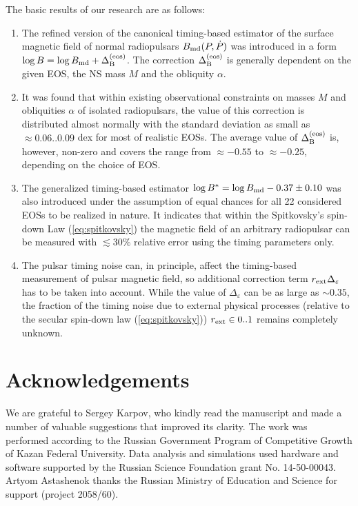 \documentclass[fleqn,usenatbib]{mnras}
\begin{document}
The basic results of our research are as follows:
\begin{enumerate}
\item The refined version of the canonical timing-based estimator of
the surface magnetic field of normal radiopulsars $B_{\rm md}(P,
\dot P)$ was introduced in a form $\log B = \log B_{\rm md} +
\Delta^{\rm (eos)}_{\rm B}$. The correction $\Delta^{\rm
(eos)}_{\rm B}$ is generally dependent on the given EOS, the NS mass $M$ and the obliquity $\alpha$.

\item It was found
that within existing observational constraints on masses $M$ and obliquities $\alpha$ of isolated
radiopulsars, the value of this correction is distributed almost normally with the standard
deviation as small as $\approx 0.06..0.09$ dex for most of realistic
EOSs. The average value of $\Delta^{\rm (eos)}_{\rm
B}$ is, however, non-zero and covers the range from $\approx -0.55$
to $\approx -0.25$, depending on the choice of EOS.

\item The
generalized timing-based estimator $\log B^* = \log B_{\rm md} -
0.37 \pm 0.10$ was also introduced under the assumption of equal
chances for all 22 considered EOSs to be realized in
nature. It indicates that within the Spitkovsky's spin-down Law (\ref{eq:spitkovsky})
the magnetic field of an arbitrary radiopulsar can be measured with
$\lesssim 30\%$ relative error using the timing parameters only.

\item The pulsar timing noise can, in principle, affect the timing-based measurement
of pulsar magnetic field, so additional correction term $r_{\rm ext}\Delta_{\varepsilon}$
has to be taken into account. While the value of $\Delta_{\varepsilon}$ can be as large as $\sim 0.35$,
the fraction of the timing noise due to external physical processes (relative to the secular spin-down law (\ref{eq:spitkovsky})) 
$r_{\rm ext} \in 0..1$ remains completely unknown.

\end{enumerate}

\section*{Acknowledgements}
We are grateful to Sergey Karpov, who kindly read the manuscript
and made a number of valuable suggestions that improved its clarity.
The work was performed according to the Russian Government
Program of Competitive Growth of Kazan Federal University. Data
analysis and simulations used hardware and software supported by
the Russian Science Foundation grant No. 14-50-00043. Artyom
Astashenok thanks the Russian Ministry of Education and Science
for support (project 2058/60).
\end{document}
